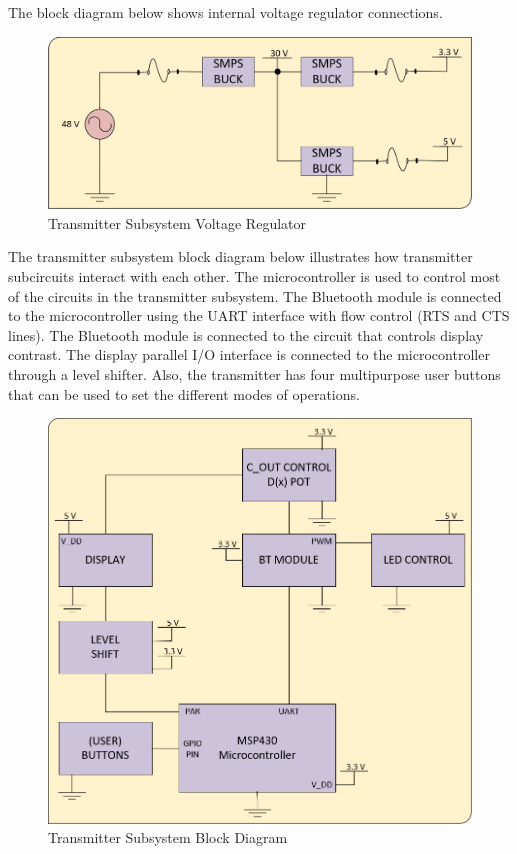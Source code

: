\documentclass[12pt]{article}
\begin{document}
\indent
The block diagram below shows internal voltage regulator connections.

\hfill

\begin{figure}[h!]
\centering
\includegraphics[width=0.88\linewidth]{trans_sub_volt_reg.png}
\caption{Transmitter Subsystem Voltage Regulator}
\end{figure}

\pagebreak

\indent
The transmitter subsystem block diagram below illustrates how transmitter subcircuits interact with each other.  The microcontroller is used to control most of the circuits in the transmitter subsystem.  The Bluetooth module is connected to the microcontroller using the UART interface with flow control (RTS and CTS lines). The Bluetooth module is connected to the circuit that controls display contrast. The display parallel I/O interface is connected to the microcontroller through a level shifter. Also, the transmitter has four multipurpose user buttons that can be used to set the different modes of operations. 

\hfill

\begin{figure}[h!]
\centering
\includegraphics[width=0.88\linewidth]{controller_block}
\caption{Transmitter Subsystem Block Diagram}
\end{figure}
\end{document}
